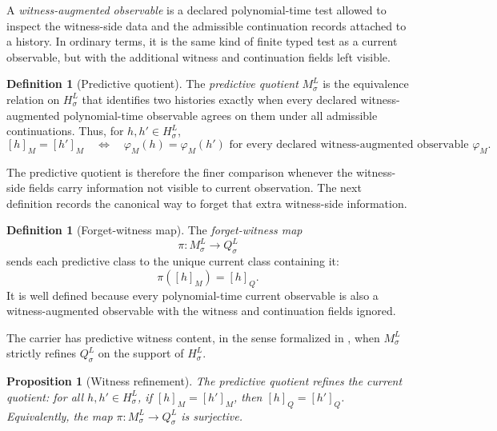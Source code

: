 \documentclass[11pt]{article}
\newcommand{\Substrate}{\sigma}             \newcommand{\Lift}{L}                       \newcommand{\LiftState}{\sigma_{L}}         \newcommand{\HistorySpace}{H_{\Substrate}^{\Lift}}
\newcommand{\Qquotient}{Q_{\Substrate}^{\Lift}}
\newcommand{\Mquotient}{M_{\Substrate}^{\Lift}}
\newcommand{\ForgetWitnessMap}{\pi}
\newcommand{\Qclass}[1]{[#1]_{Q}}
\newcommand{\Mclass}[1]{[#1]_{M}}
\newtheorem{proposition}[theorem]{Proposition}
\theoremstyle{definition}
\newtheorem{definition}[theorem]{Definition}
\begin{document}
A \emph{witness-augmented observable} is a declared polynomial-time
test allowed to inspect the witness-side data and the admissible
continuation records attached to a history.  In ordinary terms, it is
the same kind of finite typed test as a current observable, but with
the additional witness and continuation fields left visible.

\begin{definition}[Predictive quotient]
\label{def:predictive-quotient}
The \emph{predictive quotient} \(\Mquotient\) is the equivalence
relation on \(\HistorySpace\) that identifies two histories exactly
when every declared witness-augmented polynomial-time observable agrees
on them under all admissible continuations.  Thus, for
\(h,h'\in\HistorySpace\),
\[
  \Mclass{h}=\Mclass{h'}
  \quad\Longleftrightarrow\quad
  \varphi_{M}(h)=\varphi_{M}(h')
  \text{ for every declared witness-augmented observable }\varphi_{M}.
\]
\end{definition}

The predictive quotient is therefore the finer comparison whenever the
witness-side fields carry information not visible to current
observation.  The next definition records the canonical way to forget
that extra witness-side information.

\begin{definition}[Forget-witness map]
\label{def:forget-witness-map}
The \emph{forget-witness map}
\[
  \ForgetWitnessMap:\Mquotient\longrightarrow\Qquotient
\]
sends each predictive class to the unique current class containing it:
\[
  \ForgetWitnessMap(\Mclass{h})=\Qclass{h}.
\]
It is well defined because every polynomial-time current observable is
also a witness-augmented observable with the witness and continuation
fields ignored.
\end{definition}

The carrier has predictive witness content, in the sense formalized in
, when \(\Mquotient\) strictly refines
\(\Qquotient\) on the support of \(\HistorySpace\).

\begin{proposition}[Witness refinement]
\label{prop:witness-refinement}
The predictive quotient refines the current quotient: for all
\(h,h'\in\HistorySpace\), if \(\Mclass{h}=\Mclass{h'}\), then
\(\Qclass{h}=\Qclass{h'}\).  Equivalently, the map
\(\ForgetWitnessMap:\Mquotient\to\Qquotient\) is surjective.
\end{proposition}
\end{document}
